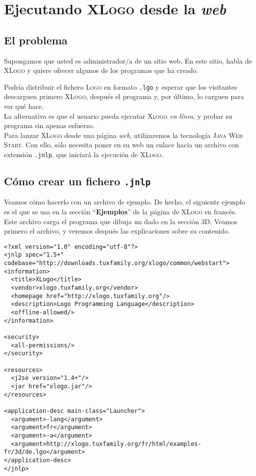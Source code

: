 \chapter{Ejecutando \textsc{XLogo} desde la \textit{web}}

\section{El problema}

Supongamos que usted es administrador/a de un sitio web. En este sitio, habla de
\textsc{XLogo} y quiere ofrecer algunos de los programas que ha creado.

Podr\'ia distribuir el fichero \textsc{Logo} en formato \texttt{.lgo} y esperar
que los visitantes descarguen primero \textsc{XLogo}, despu\'es el programa y, por
\'ultimo, lo carguen para ver qu\'e hace. \\

\noindent La alternativa es que el usuario pueda ejecutar \textsc{Xlogo} 
\textit{en l\'inea}, y probar su programa sin apenas esfuerzo. \\

\noindent Para lanzar \textsc{XLogo} desde una p\'agina \textit{web}, utilizaremos
la tecnolog\'ia \textsc{Java Web Start}. Con ello, s\'olo necesita poner en su
web un enlace hacia un archivo con extensi\'on \texttt{.jnlp}, que iniciar\'a la
ejecuci\'on de \textsc{XLogo}.

\section{C\'omo crear un fichero \texttt{.jnlp}}

Veamos c\'omo hacerlo con un archivo de ejemplo. De hecho, el siguiente ejemplo es
el que se usa en la secci\'on ``\textbf{Ejemplos}'' de la p\'agina de \textsc{XLogo} 
en franc\'es. \\

\noindent Este archivo carga el programa que dibuja un dado en la secci\'on 3D.
Veamos primero el archivo, y veremos despu\'es las explicaciones sobre su contenido.

\begin{verbatim}
<?xml version="1.0" encoding="utf-8"?>
<jnlp spec="1.5+" codebase="http://downloads.tuxfamily.org/xlogo/common/webstart">
<information>
  <title>XLogo</title>
  <vendor>xlogo.tuxfamily.org</vendor>
  <homepage href="http://xlogo.tuxfamily.org"/>
  <description>Logo Programming Language</description>
  <offline-allowed/>
</information>

<security>
  <all-permissions/>
</security>

<resources>
  <j2se version="1.4+"/>
  <jar href="xlogo.jar"/>
</resources>

<application-desc main-class="Launcher">
  <argument>-lang</argument>
  <argument>fr</argument>
  <argument>-a</argument>
  <argument>http://xlogo.tuxfamily.org/fr/html/examples-fr/3d/de.lgo</argument>
</application-desc>
</jnlp>
\end{verbatim}


